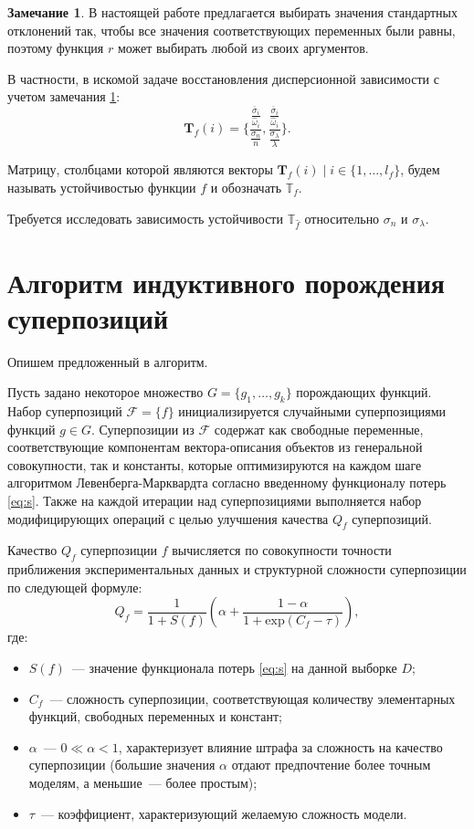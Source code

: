 \documentclass[12pt,a4paper]{article}
\theoremstyle{definition}
\newtheorem{note}{Замечание}
\begin{document}
\begin{note}
В настоящей работе предлагается выбирать значения стандартных отклонений так, чтобы
все значения соответствующих переменных были равны, поэтому функция $r$ может выбирать
любой из своих аргументов.
\label{note:r_equality}
\end{note}

В частности, в искомой задаче восстановления дисперсионной зависимости с
учетом замечания \ref{note:r_equality}:
\[
  \mathbf{T}_f(i) = \Big\{ \frac{\frac{\overline{\sigma}_i}{\hat{\omega}_i}}{\frac{\sigma_n}{n}}, \frac{\frac{\overline{\sigma}_i}{\hat{\omega}_i}}{\frac{\sigma_{\lambda}}{\lambda}} \Big\}.
\]

Матрицу, столбцами которой являются векторы $\mathbf{T}_f(i) \mid i \in \{ 1, \dots, l_f \}$,
будем называть устойчивостью функции $f$ и обозначать $\mathbb{T}_f$.

Требуется исследовать зависимость устойчивости $\mathbb{T}_{\hat{f}}$ относительно
$\sigma_n$ и $\sigma_{\lambda}$.

\section{Алгоритм индуктивного порождения суперпозиций}

Опишем предложенный в \cite{Rudoy13} алгоритм.

Пусть задано некоторое множество $G = \{ g_1, \dots, g_k \}$ 
порождающих функций. Набор суперпозиций $\mathcal{F} = \{ f \}$
инициализируется случайными суперпозициями функций $g \in G$. Суперпозиции из
$\mathcal{F}$ содержат как свободные переменные, соответствующие
компонентам вектора-описания объектов из генеральной совокупности, так и
константы, которые оптимизируются на каждом шаге алгоритмом Левенберга-Марквардта
согласно введенному функционалу потерь \eqref{eq:s}. Также на каждой итерации
над суперпозициями выполняется набор модифицирующих операций с целью улучшения
качества $Q_f$ суперпозиций.

Качество $Q_f$ суперпозиции $f$ вычисляется по совокупности точности приближения
экспериментальных данных и структурной сложности суперпозиции по следующей формуле:
\begin{equation}
  Q_f = \frac{1}{1 + S(f)} \left(\alpha + \frac{1 - \alpha}{1 + \text{exp} (C_f - \tau)}\right),
  \label{eq:s_f}
\end{equation}
где:
\begin{itemize}
  \item[] $S(f)$~--- значение функционала потерь \eqref{eq:s} на данной выборке $D$;
  \item[] $C_f$~--- сложность суперпозиции, соответствующая количеству элементарных
	функций, свободных переменных и констант;
  \item[] $\alpha$~--- $0 \ll \alpha < 1$, характеризует влияние штрафа за сложность
	на качество суперпозиции (большие значения $\alpha$ отдают предпочтение более
	точным моделям, а меньшие~--- более простым);
  \item[] $\tau$~--- коэффициент, характеризующий желаемую сложность модели.
\end{itemize}
\end{document}
